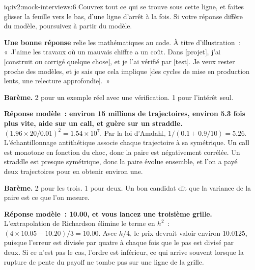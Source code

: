\begin{solution}{iq:iv2:mock-interviews:6}
Couvrez tout ce qui se trouve sous cette ligne, et faites glisser la feuille vers le bas, d'une ligne d'arrêt à la fois. Si votre réponse diffère du modèle, poursuivez à partir du modèle.

\ivstop
\textbf{Une bonne réponse} relie les mathématiques au code. À titre d'illustration~: «~J'aime les travaux où un mauvais chiffre a un coût. Dans [projet], j'ai [construit ou corrigé quelque chose], et je l'ai vérifié par [test]. Je veux rester proche des modèles, et je sais que cela implique [des cycles de mise en production lents, une relecture approfondie].~»

\textbf{Barème.} 2 pour un exemple réel avec une vérification. 1 pour l'intérêt seul.

\ivstop
\textbf{Réponse modèle~: environ 15 millions de trajectoires, environ 5.3 fois plus vite, aide sur un call, et guère sur un straddle.} $(1.96 \times 20/0.01)^2 = 1.54 \times 10^7$. Par la loi d'Amdahl, $1/(0.1 + 0.9/10) = 5.26$. L'échantillonnage antithétique associe chaque trajectoire à sa symétrique. Un call est monotone en fonction du choc, donc la paire est négativement corrélée. Un straddle est presque symétrique, donc la paire évolue ensemble, et l'on a payé deux trajectoires pour en obtenir environ une.

\textbf{Barème.} 2 pour les trois. 1 pour deux. Un bon candidat dit que la variance de la paire est ce que l'on mesure.

\ivstop
\textbf{Réponse modèle~: 10.00, et vous lancez une troisième grille.} L'extrapolation de Richardson élimine le terme en $h^2$~: $(4 \times 10.05 - 10.20)/3 = 10.00$. Avec $h/4$, le prix devrait valoir environ 10.0125, puisque l'erreur est divisée par quatre à chaque fois que le pas est divisé par deux. Si ce n'est pas le cas, l'ordre est inférieur, ce qui arrive souvent lorsque la rupture de pente du payoff ne tombe pas sur une ligne de la grille.


\end{solution}
